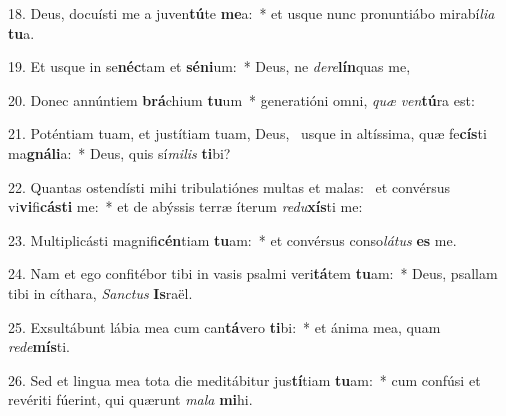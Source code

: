 18. Deus, docuísti me a juven\textbf{tú}te \textbf{me}a:~*  et usque nunc pronuntiábo mirabí\textit{li}\textit{a} \textbf{tu}a.\

19. Et usque in se\textbf{néc}tam et \textbf{sé}\textbf{ni}um:~*  Deus, ne \textit{de}\textit{re}\textbf{lín}quas me,\

20. Donec annúntiem \textbf{brá}chium \textbf{tu}um~*  generatióni omni, \textit{quæ} \textit{ven}\textbf{tú}ra est:\

21. Poténtiam tuam, et justítiam tuam, Deus, \dag\  usque in altíssima, quæ fe\textbf{cís}ti ma\textbf{gná}\textbf{li}a:~*  Deus, quis sí\textit{mi}\textit{lis} \textbf{ti}bi?\

22. Quantas ostendísti mihi tribulatiónes multas et malas: \dag\  et convérsus vi\textbf{vi}fi\textbf{cás}\textbf{ti} me:~*  et de abýssis terræ íterum \textit{re}\textit{du}\textbf{xís}ti me:\

23. Multiplicásti magnifi\textbf{cén}tiam \textbf{tu}am:~*  et convérsus conso\textit{lá}\textit{tus} \textbf{es} me.\

24. Nam et ego confitébor tibi in vasis psalmi veri\textbf{tá}tem \textbf{tu}am:~*  Deus, psallam tibi in cíthara, \textit{Sanc}\textit{tus} \textbf{Is}raël.\

25. Exsultábunt lábia mea cum can\textbf{tá}vero \textbf{ti}bi:~*  et ánima mea, quam \textit{red}\textit{e}\textbf{mís}ti.\

26. Sed et lingua mea tota die meditábitur jus\textbf{tí}tiam \textbf{tu}am:~*  cum confúsi et revériti fúerint, qui quærunt \textit{ma}\textit{la} \textbf{mi}hi.\

